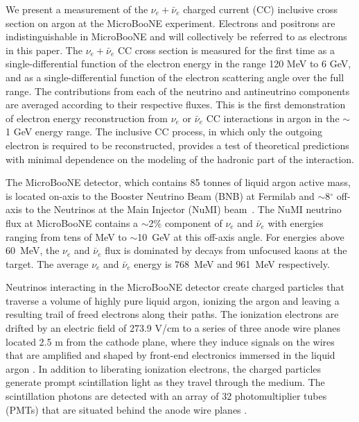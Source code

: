 \documentclass[%
twocolumn,
superscriptaddress,
showpacs,preprintnumbers,
amsmath,amssymb,
aps,
prl,
longbibliography
]{revtex4-1}
\begin{document}
We present a measurement of the $\nu_e + \bar{\nu}_e$ charged current (CC) inclusive cross section on argon at the MicroBooNE experiment. Electrons and positrons are indistinguishable in MicroBooNE and will collectively be referred to as electrons in this paper. The $\nu_e + \bar{\nu}_e$ CC cross section is measured for the first time as a single-differential function of the electron energy in the range 120 MeV to 6 GeV, and as a single-differential function of the electron scattering angle over the full range. 
The contributions from each of the neutrino and antineutrino components are averaged according to their respective fluxes. This is the first demonstration of electron energy reconstruction from $\nu_{e}$ or $\bar{\nu}_{e}$ CC interactions in argon in the $\sim$1 GeV energy range.
The inclusive CC process, in which only the outgoing electron is required to be reconstructed, provides a test of theoretical predictions with minimal dependence on the modeling of the hadronic part of the interaction.


The MicroBooNE detector, which contains 85 tonnes of liquid argon active mass, is located on-axis to the Booster Neutrino Beam (BNB) at Fermilab and $\sim$8$^\circ$ off-axis to the Neutrinos at the Main Injector (NuMI) beam~\cite{ADAMSON2016279}. The NuMI neutrino flux at MicroBooNE contains a $\sim$2\% component of $\nu_{e}$ and $\bar{\nu}_{e}$ with energies ranging from tens of MeV to $\sim$10~GeV at this off-axis angle. For energies above 60~MeV, the $\nu_e$ and $\bar{\nu}_e$ flux is dominated by decays from unfocused kaons at the target. The average $\nu_e$ and $\bar{\nu}_e$ energy is 768~MeV and 961~MeV respectively. 


Neutrinos interacting in the MicroBooNE detector create charged particles that traverse a volume of highly pure liquid argon, ionizing the argon and leaving a resulting trail of freed electrons along their paths. The ionization electrons are drifted by an electric field of 273.9 V/cm to a series of three anode wire planes located 2.5 m from the cathode plane, where they induce signals on the wires that are amplified and shaped by front-end electronics immersed in the liquid argon \cite{noise_paper}.  In addition to liberating ionization electrons, the charged particles generate prompt scintillation light as they travel through the medium. The scintillation photons are detected with an array of 32 photomultiplier tubes (PMTs) that are situated behind the anode wire planes \cite{pmt_paper}.
 
\end{document}
